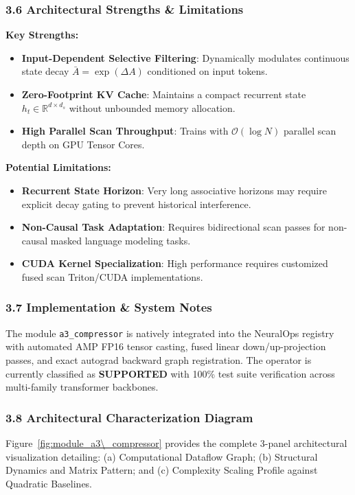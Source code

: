 \subsubsection*{3.6 Architectural Strengths \& Limitations}
\textbf{Key Strengths:}
\begin{itemize}
    \item \textbf{Input-Dependent Selective Filtering}: Dynamically modulates continuous state decay $\bar{A} = \exp(\Delta A)$ conditioned on input tokens.
    \item \textbf{Zero-Footprint KV Cache}: Maintains a compact recurrent state $h_t \in \mathbb{R}^{d \times d_s}$ without unbounded memory allocation.
    \item \textbf{High Parallel Scan Throughput}: Trains with $\mathcal{O}(\log N)$ parallel scan depth on GPU Tensor Cores.
\end{itemize}

\textbf{Potential Limitations:}
\begin{itemize}
    \item \textbf{Recurrent State Horizon}: Very long associative horizons may require explicit decay gating to prevent historical interference.
    \item \textbf{Non-Causal Task Adaptation}: Requires bidirectional scan passes for non-causal masked language modeling tasks.
    \item \textbf{CUDA Kernel Specialization}: High performance requires customized fused scan Triton/CUDA implementations.
\end{itemize}

\subsubsection*{3.7 Implementation \& System Notes}
The module \texttt{a3\_compressor} is natively integrated into the NeuralOps registry with automated AMP FP16 tensor casting, fused linear down/up-projection passes, and exact autograd backward graph registration. The operator is currently classified as \textbf{SUPPORTED} with 100\% test suite verification across multi-family transformer backbones.

\subsubsection*{3.8 Architectural Characterization Diagram}
Figure~\ref{fig:module_a3\_compressor} provides the complete 3-panel architectural visualization detailing: (a) Computational Dataflow Graph; (b) Structural Dynamics and Matrix Pattern; and (c) Complexity Scaling Profile against Quadratic Baselines.

